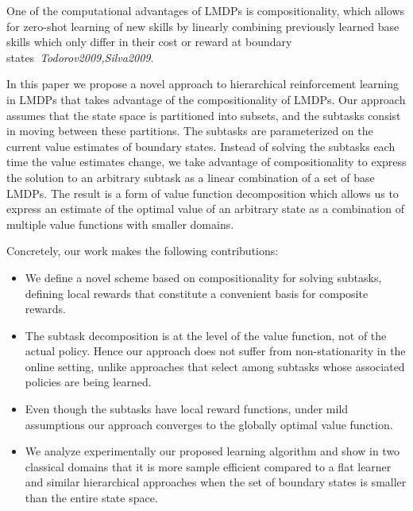 One of the computational advantages of LMDPs is compositionality, which allows for zero-shot learning of new skills by linearly combining previously learned base skills which only differ in their cost or reward at boundary states~\textit{Todorov2009,Silva2009}.


In this paper we propose a novel approach to hierarchical reinforcement learning in LMDPs that takes advantage of the compositionality of LMDPs. Our approach assumes that the state space is partitioned into subsets, and the subtasks consist in moving between these partitions. The subtasks are parameterized on the current value estimates of boundary states. Instead of solving the subtasks each time the value estimates change, we take advantage of compositionality to express the solution to an arbitrary subtask as a linear combination of a set of base LMDPs. The result is a form of value function decomposition which allows us to express an estimate of the optimal value of an arbitrary state as a combination of multiple value functions with smaller domains.

Concretely, our work makes the following contributions:
\begin{itemize}
\item We define a novel scheme based on compositionality for solving subtasks, defining local rewards that constitute a convenient basis for composite rewards.
\item The subtask decomposition is at the level of the value function, not of the actual policy. Hence our approach does not suffer from non-stationarity in the online setting, unlike approaches that select among subtasks whose associated policies are being learned.
\item Even though the subtasks have local reward functions, under mild assumptions our approach converges to the globally optimal value function.
\item We analyze experimentally our proposed learning algorithm and show in two classical domains 
that it is more sample efficient compared to a flat learner and similar hierarchical approaches when the set of boundary states is smaller than the entire state space.
\end{itemize}


